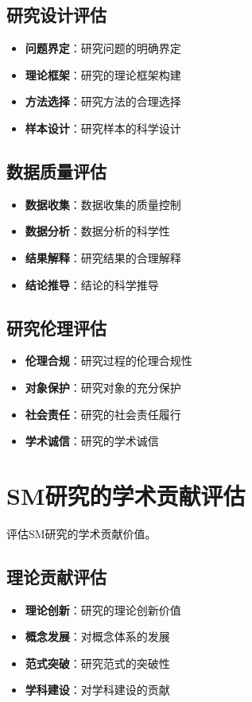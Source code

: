 \documentclass[12pt,UTF8]{ctexbook}
\begin{document}
\subsection{研究设计评估}
\begin{itemize}[leftmargin=2cm]
	\item \textbf{问题界定}：研究问题的明确界定
	\item \textbf{理论框架}：研究的理论框架构建
	\item \textbf{方法选择}：研究方法的合理选择
	\item \textbf{样本设计}：研究样本的科学设计
\end{itemize}

\subsection{数据质量评估}
\begin{itemize}[leftmargin=2cm]
	\item \textbf{数据收集}：数据收集的质量控制
	\item \textbf{数据分析}：数据分析的科学性
	\item \textbf{结果解释}：研究结果的合理解释
	\item \textbf{结论推导}：结论的科学推导
\end{itemize}

\subsection{研究伦理评估}
\begin{itemize}[leftmargin=2cm]
	\item \textbf{伦理合规}：研究过程的伦理合规性
	\item \textbf{对象保护}：研究对象的充分保护
	\item \textbf{社会责任}：研究的社会责任履行
	\item \textbf{学术诚信}：研究的学术诚信
\end{itemize}

\section{SM研究的学术贡献评估}
评估SM研究的学术贡献价值。

\subsection{理论贡献评估}
\begin{itemize}[leftmargin=2cm]
	\item \textbf{理论创新}：研究的理论创新价值
	\item \textbf{概念发展}：对概念体系的发展
	\item \textbf{范式突破}：研究范式的突破性
	\item \textbf{学科建设}：对学科建设的贡献
\end{itemize}
\end{document}

